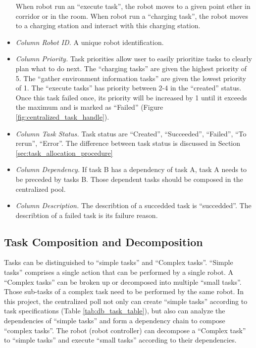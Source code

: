 \begin{table}[htb]
\begin{itemize}
	When robot run an ``execute task'', the robot moves to a given point ether in corridor or in the room. When robot run a ``charging task'', the robot moves to a charging station and interact with this charging station.
	\item \textsl{Column Robot ID.} A unique robot identification.
	\item \textsl{Column Priority.} Task priorities allow user to easily prioritize tasks to clearly plan what to do next. The ``charging tasks'' are given the highest priority of 5. The ``gather environment information tasks'' are given the lowest priority of 1. The ``execute tasks'' has priority between 2-4 in the ``created'' status. Once this task failed once, its priority will be increased by 1 until it exceeds the maximum and is marked as ``Failed'' (Figure \ref{fig:centralized_task_handle}).
	\item \textsl{Column Task Status.} Task status are ``Created'', ``Succeeded'', ``Failed'', ``To rerun'', ``Error''. The difference between task status is discussed in Section \ref{sec:task_allocation_procedure}
	\item \textsl{Column Dependency.} If task B has a dependency of task A, task A needs to be preceded by tasks B. Those dependent tasks should be composed in the centralized pool.
	\item \textsl{Column Description.} The describtion of a succedded task is ``succedded''.  The describtion of a failed task is its failure reason.
\end{itemize}
\end{table}


\subsection{Task Composition and Decomposition}
Tasks can be distinguished to ``simple tasks'' and ``Complex tasks''.  ``Simple tasks'' comprises a single action that can be performed by a single robot. A ``Complex tasks'' can be broken up or decomposed into multiple ``small tasks''. Those sub-tasks of a complex task need to be performed by the same robot.
In this project, the centralized poll not only can create ``simple tasks'' according to task specifications (Table \ref{tab:db_task_table}), but also can analyze the dependencies of ``simple tasks'' and form a dependency chain to compose ``complex tasks''. The robot (robot controller) can decompose a ``Complex task'' to ``simple tasks'' and execute ``small tasks'' according to their dependencies.

